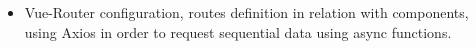 \documentclass[letterpaper]{twentysecondcv} %
\begin{document}
\begin{twenty}
{\begin{itemize}
\begin{itemize}
                    \item Vue-Router configuration, routes definition in relation with components, using Axios in order to request sequential data using async functions. %
                    

                    
                    

                \end{itemize}
            \end{itemize}
        }

                    
                
            
                        

\end{twenty}
\end{document}
